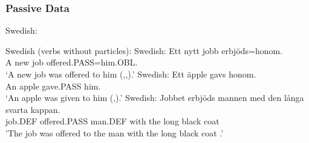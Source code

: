 \subsubsection{Passive Data}
\begin{exe}
	 Swedish:
	\begin{xlist}
	\end{xlist}	
	 Swedish (verbs without particles):
	 Swedish:
		\gll Ett nytt jobb erbjöds=honom.\\
		A new job offered.PASS=him.OBL.\\
		\trans `A new job was offered to him (\citealt{Anward.1989},\citealt{Falk.1990},\citealt{Lundquist.2006}).'\pagebreak
	 Swedish:
		\gll *Ett äpple gavs honom.\\
		 An apple gave.PASS him.\\
		 \trans `An apple was given to him (\citealt{Anward.1989},\citealt{Lundquist.2006}).'
	  Swedish:
		\gll Jobbet erbjöds mannen med den långa svarta kappan.\\
		job.DEF offered.PASS man.DEF with the long black coat\\
		'The job was offered to the man with the long black coat \citep[ex 26]{Lundquist.2004}.'


\end{exe}
